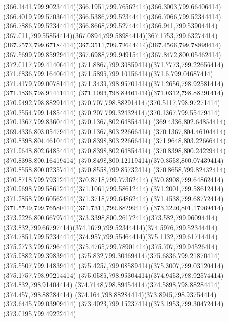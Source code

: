 {{	\curveto(366.1441,799.90234414)(366.1951,799.76562414)(366.3003,799.66406414)
	\curveto(366.4019,799.57036414)(366.5386,799.52344414)(366.7066,799.52344414)
	\curveto(366.7886,799.52344414)(366.8668,799.52744414)(366.941,799.53904414)
	\curveto(367.011,799.55854414)(367.0894,799.58984414)(367.1753,799.63274414)
	\curveto(367.2573,799.67184414)(367.3511,799.72644414)(367.4566,799.78899414)
	\curveto(367.5699,799.85929414)(367.6988,799.94915414)(367.8472,800.05462414)
	\closepath
	\moveto(372.0117,799.41406414)
	\curveto(371.8867,799.30859414)(371.7773,799.22656414)(371.6836,799.16406414)
	\curveto(371.5896,799.10156414)(371.5,799.04687414)(371.4179,799.00781414)
	\curveto(371.3439,798.95701414)(371.2656,798.92581414)(371.1836,798.91411414)
	\curveto(371.1096,798.89461414)(371.0312,798.88291414)(370.9492,798.88291414)
	\curveto(370.707,798.88291414)(370.5117,798.97271414)(370.3554,799.14854414)
	\curveto(370.207,799.32432414)(370.1367,799.55479414)(370.1367,799.83604414)
	\lineto(370.1367,802.64854414)
	\lineto(369.4336,802.64854414)
	\lineto(369.4336,803.05479414)
	\lineto(370.1367,803.22666414)
	\lineto(370.1367,804.46104414)
	\lineto(370.8398,804.46104414)
	\lineto(370.8398,803.22666414)
	\lineto(371.9648,803.22666414)
	\lineto(371.9648,802.64854414)
	\lineto(370.8398,802.64854414)
	\lineto(370.8398,800.24229414)
	\lineto(370.8398,800.16419414)
	\curveto(370.8498,800.12119414)(370.8558,800.07439414)(370.8558,800.02357414)
	\lineto(370.8558,799.86732414)
	\curveto(370.8658,799.82432414)(370.8718,799.79312414)(370.8718,799.77362414)
	\curveto(370.8908,799.64862414)(370.9698,799.58612414)(371.1061,799.58612414)
	\curveto(371.2001,799.58612414)(371.2858,799.60562414)(371.3718,799.64862414)
	\curveto(371.4538,799.68772414)(371.5749,799.76580414)(371.7311,799.88299414)
	\closepath
	\moveto(373.2226,801.17969414)
	\curveto(373.2226,800.66797414)(373.3398,800.26172414)(373.582,799.96094414)
	\curveto(373.832,799.66797414)(374.1679,799.52344414)(374.5976,799.52344414)
	\curveto(374.7851,799.52344414)(374.957,799.55464414)(375.1132,799.61714414)
	\curveto(375.2773,799.67964414)(375.4765,799.78901414)(375.707,799.94526414)
	\lineto(375.9882,799.39839414)
	\curveto(375.832,799.30469414)(375.6836,799.21870414)(375.5507,799.14839414)
	\curveto(375.4257,799.08589414)(375.3007,799.03120414)(375.1757,798.99214414)
	\curveto(375.0586,798.95304414)(374.9453,798.92574414)(374.832,798.91404414)
	\curveto(374.7148,798.89454414)(374.5898,798.88284414)(374.457,798.88284414)
	\curveto(374.164,798.88284414)(373.8945,798.93754414)(373.6445,799.03909414)
	\curveto(373.4023,799.15237414)(373.1953,799.30472414)(373.0195,799.49222414)
}}
